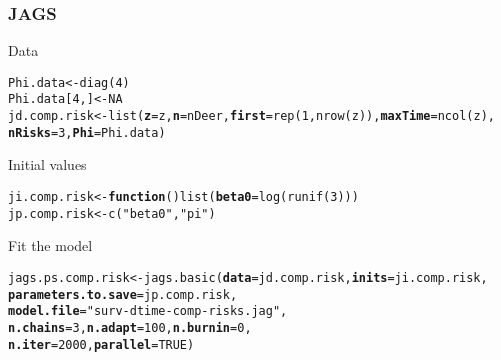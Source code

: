 \documentclass[color=usenames,dvipsnames]{beamer}\usepackage[]{graphicx}\usepackage[]{xcolor}
\makeatletter
\newcommand{\hlnum}[1]{\textcolor[rgb]{0.69,0.494,0}{#1}}%
\newcommand{\hlsng}[1]{\textcolor[rgb]{0.749,0.012,0.012}{#1}}%
\newcommand{\hldef}[1]{\textcolor[rgb]{0,0,0}{#1}}%
\newcommand{\hlkwa}[1]{\textcolor[rgb]{0,0,0}{\textbf{#1}}}%
\newcommand{\hlkwb}[1]{\textcolor[rgb]{0,0.341,0.682}{#1}}%
\newcommand{\hlkwc}[1]{\textcolor[rgb]{0,0,0}{\textbf{#1}}}%
\newcommand{\hlkwd}[1]{\textcolor[rgb]{0.004,0.004,0.506}{#1}}%
\newenvironment{kframe}{%
 \def\at@end@of@kframe{}%
 \ifinner\ifhmode%
  \def\at@end@of@kframe{\end{minipage}}%
  \begin{minipage}{\columnwidth}%
 \fi\fi%
 \def\FrameCommand##1{\hskip\@totalleftmargin \hskip-\fboxsep
 \colorbox{shadecolor}{##1}\hskip-\fboxsep
     \hskip-\linewidth \hskip-\@totalleftmargin \hskip\columnwidth}%
 \MakeFramed {\advance\hsize-\width
   \@totalleftmargin\z@ \linewidth\hsize
   \@setminipage}}%
 {\par\unskip\endMakeFramed%
 \at@end@of@kframe}
\newenvironment{knitrout}{}{} %
\let\hlstd\hldef
\let\hlstr\hlsng
\makeatother
\begin{document}
\begin{frame}[fragile]
  \frametitle{JAGS}
  Data
\begin{knitrout}\scriptsize
{}\color{fgcolor}\begin{kframe}
\begin{alltt}
\hldef{Phi.data} \hlkwb{<-} \hlkwd{diag}\hldef{(}\hlnum{4}\hldef{)}
\hldef{Phi.data[}\hlnum{4}\hldef{,]} \hlkwb{<-} \hlnum{NA}
\hldef{jd.comp.risk} \hlkwb{<-} \hlkwd{list}\hldef{(}\hlkwc{z}\hldef{=z,} \hlkwc{n}\hldef{=nDeer,} \hlkwc{first}\hldef{=}\hlkwd{rep}\hldef{(}\hlnum{1}\hldef{,}\hlkwd{nrow}\hldef{(z)),} \hlkwc{maxTime}\hldef{=}\hlkwd{ncol}\hldef{(z),}
                     \hlkwc{nRisks}\hldef{=}\hlnum{3}\hldef{,} \hlkwc{Phi}\hldef{=Phi.data)}
\end{alltt}
\end{kframe}
\end{knitrout}
  Initial values
  \scriptsize
\begin{knitrout}\scriptsize
{}\color{fgcolor}\begin{kframe}
\begin{alltt}
\hldef{ji.comp.risk} \hlkwb{<-} \hlkwa{function}\hldef{()} \hlkwd{list}\hldef{(}\hlkwc{beta0}\hldef{=}\hlkwd{log}\hldef{(}\hlkwd{runif}\hldef{(}\hlnum{3}\hldef{)))}
\hldef{jp.comp.risk} \hlkwb{<-} \hlkwd{c}\hldef{(}\hlsng{"beta0"}\hldef{,} \hlsng{"pi"}\hldef{)}
\end{alltt}
\end{kframe}
\end{knitrout}
\pause
\vfill
  {\normalsize Fit the model}
\begin{knitrout}\scriptsize
{}\color{fgcolor}\begin{kframe}
\begin{alltt}
\hlstd{jags.ps.comp.risk} \hlkwb{<-} \hlkwd{jags.basic}\hlstd{(}\hlkwc{data}\hlstd{=jd.comp.risk,} \hlkwc{inits}\hlstd{=ji.comp.risk,}
                                \hlkwc{parameters.to.save}\hlstd{=jp.comp.risk,}
                                \hlkwc{model.file}\hlstd{=}\hlstr{"surv-dtime-comp-risks.jag"}\hlstd{,}
                                \hlkwc{n.chains}\hlstd{=}\hlnum{3}\hlstd{,} \hlkwc{n.adapt}\hlstd{=}\hlnum{100}\hlstd{,} \hlkwc{n.burnin}\hlstd{=}\hlnum{0}\hlstd{,}
                                \hlkwc{n.iter}\hlstd{=}\hlnum{2000}\hlstd{,} \hlkwc{parallel}\hlstd{=}\hlnum{TRUE}\hlstd{)}
\end{alltt}
\end{kframe}
\end{knitrout}
\end{frame}
\end{document}
